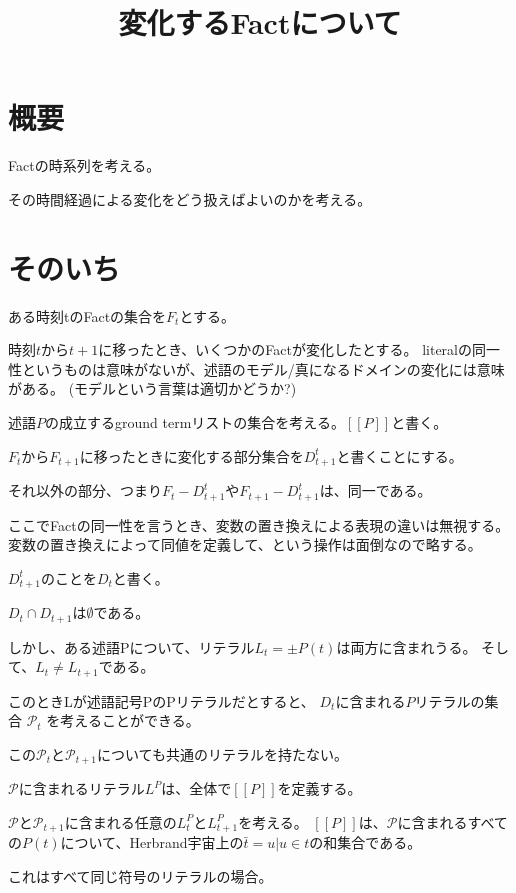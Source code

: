 \documentclass[10pt, onecolumn]{jarticle}   	%
\title{変化するFactについて}
\author{\myname}
\date{}					%
\begin{document}
\maketitle

\section{概要}
Factの時系列を考える。

その時間経過による変化をどう扱えばよいのかを考える。


\section{そのいち}


ある時刻tのFactの集合を$F_t$とする。

時刻$t$から$t+1$に移ったとき、いくつかのFactが変化したとする。
literalの同一性というものは意味がないが、述語のモデル/真になるドメインの変化には意味がある。
(モデルという言葉は適切かどうか?)

述語$P$の成立するground termリストの集合を考える。$[[P]]$と書く。

$F_t$から$F_{t+1}$に移ったときに変化する部分集合を$D^t_{t+1}$と書くことにする。

それ以外の部分、つまり$F_t - D^t_{t+1}$や$F_{t+1} - D^t_{t+1}$は、同一である。

ここでFactの同一性を言うとき、変数の置き換えによる表現の違いは無視する。
変数の置き換えによって同値を定義して、という操作は面倒なので略する。

$D^t_{t+1}$のことを$D_t$と書く。

$D_t \cap D_{t+1}$は$\emptyset$である。

しかし、ある述語Pについて、リテラル$L_t = ±P(t)$は両方に含まれうる。
そして、$L_t \neq L_{t+1}$である。

このときLが述語記号PのPリテラルだとすると、
$D_t$に含まれる$Pリテラル$の集合 $\mathcal{P}_t$ を考えることができる。

この$\mathcal{P}_t$と$\mathcal{P}_{t+1}$についても共通のリテラルを持たない。

$\mathcal{P}$に含まれるリテラル$L^P$は、全体で$[[P]]$を定義する。




$\mathcal{P}$と$\mathcal{P}_{t+1}$に含まれる任意の$L^P_t$と$L^P_{t+1}$を考える。
$[[P]]$は、$\mathcal{P}$に含まれるすべての$P(t)$について、Herbrand宇宙上の$\bar{t}={u|u \in t}
の和集合$である。

これはすべて同じ符号のリテラルの場合。
\end{document}
